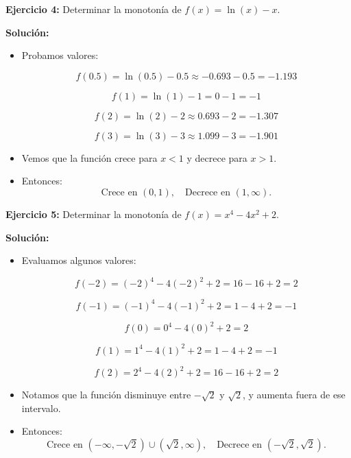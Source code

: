 \documentclass{profesor}
\begin{document}
\textbf{Ejercicio 4:} Determinar la monotonía de \( f(x) = \ln(x) - x \).

\textbf{Solución:}  
\begin{itemize}
    \item Probamos valores:
    
    \[
    f(0.5) = \ln(0.5) - 0.5 \approx -0.693 - 0.5 = -1.193
    \]
    
    \[
    f(1) = \ln(1) - 1 = 0 - 1 = -1
    \]
    
    \[
    f(2) = \ln(2) - 2 \approx 0.693 - 2 = -1.307
    \]
    
    \[
    f(3) = \ln(3) - 3 \approx 1.099 - 3 = -1.901
    \]

    \item Vemos que la función crece para \( x < 1 \) y decrece para \( x > 1 \).
    \item Entonces:
    \[
    \text{Crece en } (0,1), \quad \text{Decrece en } (1, \infty).
    \]
\end{itemize}

\textbf{Ejercicio 5:} Determinar la monotonía de \( f(x) = x^4 - 4x^2 + 2 \).

\textbf{Solución:}  
\begin{itemize}
    \item Evaluamos algunos valores:

    \[
    f(-2) = (-2)^4 - 4(-2)^2 + 2 = 16 - 16 + 2 = 2
    \]

    \[
    f(-1) = (-1)^4 - 4(-1)^2 + 2 = 1 - 4 + 2 = -1
    \]

    \[
    f(0) = 0^4 - 4(0)^2 + 2 = 2
    \]

    \[
    f(1) = 1^4 - 4(1)^2 + 2 = 1 - 4 + 2 = -1
    \]

    \[
    f(2) = 2^4 - 4(2)^2 + 2 = 16 - 16 + 2 = 2
    \]

    \item Notamos que la función disminuye entre \( -\sqrt{2} \) y \( \sqrt{2} \), y aumenta fuera de ese intervalo.
    \item Entonces:
    \[
    \text{Crece en } (-\infty, -\sqrt{2}) \cup (\sqrt{2}, \infty), \quad \text{Decrece en } (-\sqrt{2}, \sqrt{2}).
    \]
\end{itemize}
\end{document}
